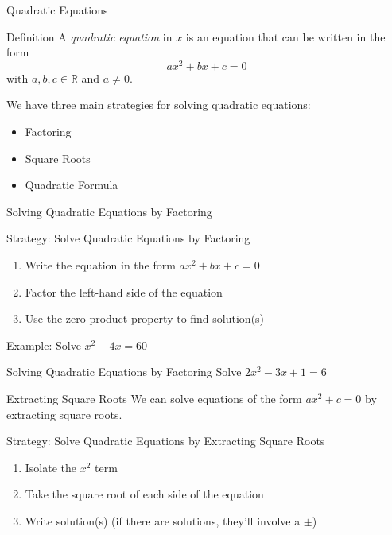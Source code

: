 \documentclass{beamer}
\def\R{\mathbb{R}} %
\begin{document}
\begin{frame}[t]{Quadratic Equations}
\begin{block}{Definition}
A \textit{quadratic equation} in $x$ is an equation that can be written in the form $$ax^2 + bx + c = 0$$ with $a,b,c\in\R$ and $a \neq 0$.
\end{block}

\pause

We have three main strategies for solving quadratic equations: \begin{itemize}
\pause \item Factoring
\pause \item Square Roots
\pause \item Quadratic Formula
\end{itemize}
\end{frame}

\begin{frame}[t]{Solving Quadratic Equations by Factoring}
\begin{block}{Strategy: Solve Quadratic Equations by Factoring}
\begin{enumerate}[1)]
\item Write the equation in the form $ax^2 + bx + c = 0$
\item Factor the left-hand side of the equation
\item Use the zero product property to find solution(s)
\end{enumerate}
\end{block}

\pause \vfill

Example: Solve $x^2 - 4x = 60$
\end{frame}

\begin{frame}[t]{Solving Quadratic Equations by Factoring}
Solve $2x^2 - 3x + 1 = 6$
\end{frame}

\begin{frame}[t]{Extracting Square Roots}
We can solve equations of the form $ax^2 + c = 0$ by extracting square roots.

\pause

\begin{block}{Strategy: Solve Quadratic Equations by Extracting Square Roots}
\begin{enumerate}[1)]
\item Isolate the $x^2$ term
\pause \item Take the square root of each side of the equation
\pause \item Write solution(s) (if there are solutions, they'll involve a $\pm$)
\end{enumerate}
\end{block}
\end{frame}
\end{document}
